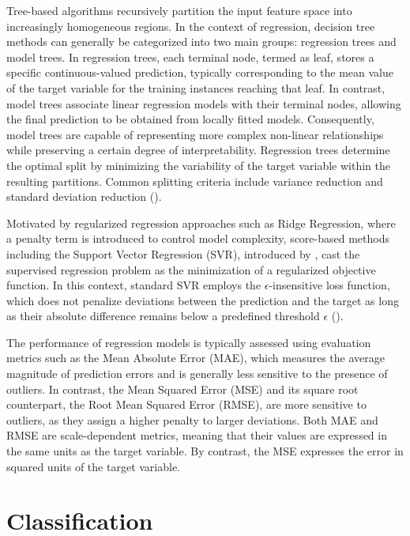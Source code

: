\documentclass[12pt]{report} %
\begin{document}
Tree-based algorithms recursively partition the input feature space into increasingly homogeneous regions. In the context of regression, decision tree methods can generally be categorized into two main groups: regression trees and model trees. In regression trees, each terminal node, termed as leaf, stores a specific continuous-valued prediction, typically corresponding to the mean value of the target variable for the training instances reaching that leaf. In contrast, model trees associate linear regression models with their terminal nodes, allowing the final prediction to be obtained from locally fitted models. Consequently, model trees are capable of representing more complex non-linear relationships while preserving a certain degree of interpretability. Regression trees determine the optimal split by minimizing the variability of the target variable within the resulting partitions. Common splitting criteria include variance reduction and standard deviation reduction (\cite{hastie2009elements}).

\newpage

Motivated by regularized regression approaches such as Ridge Regression, where a penalty term is introduced to control model complexity, score-based methods including the Support Vector Regression (SVR), introduced by \cite{cortes1995support}, cast the supervised regression problem as the minimization of a regularized objective function. In this context, standard SVR employs the $\epsilon$-insensitive loss function, which does not penalize deviations between the prediction and the target as long as their absolute difference remains below a predefined threshold $\epsilon$ (\cite{bishop2006pattern}).

The performance of regression models is typically assessed using evaluation metrics such as the Mean Absolute Error (MAE), which measures the average magnitude of prediction errors and is generally less sensitive to the presence of outliers. In contrast, the Mean Squared Error (MSE) and its square root counterpart, the Root Mean Squared Error (RMSE), are more sensitive to outliers, as they assign a higher penalty to larger deviations. Both MAE and RMSE are scale-dependent metrics, meaning that their values are expressed in the same units as the target variable. By contrast, the MSE expresses the error in squared units of the target variable.


\section{Classification} \label{sec:classification}
\end{document}
